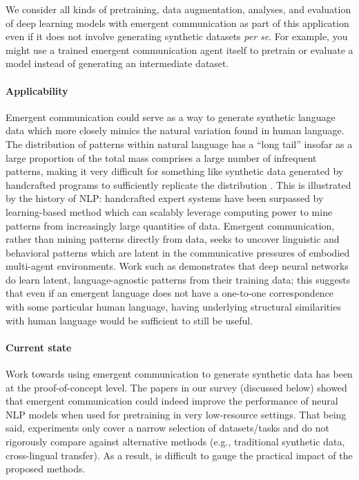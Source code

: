 We consider all kinds of pretraining, data augmentation, analyses, and evaluation of deep learning models with emergent communication as part of this application even if it does not involve generating synthetic datasets \emph{per se}.
For example, you might use a trained emergent communication agent itself to pretrain or evaluate a model instead of generating an intermediate dataset.


\paragraph{Applicability}

Emergent communication could serve as a way to generate synthetic language data which more closely mimics the natural variation found in human language.
The distribution of patterns within natural language has a ``long tail'' insofar as a large proportion of the total mass comprises a large number of infrequent patterns, making it very difficult for something like synthetic data generated by handcrafted programs to sufficiently replicate the distribution \citep{naikthesis}.
This is illustrated by the history of NLP\@: handcrafted expert systems have been surpassed by learning-based method which can scalably leverage computing power to mine patterns from increasingly large quantities of data.
Emergent communication, rather than mining patterns directly from data, seeks to uncover linguistic and behavioral patterns which are latent in the communicative pressures of embodied multi-agent environments.
Work such as \citet{artetxe-etal-2020-cross} demonstrates that deep neural networks do learn latent, language-agnostic patterns from their training data;
  this suggests that even if an emergent language does not have a one-to-one correspondence with some particular human language, having underlying structural similarities with human language would be sufficient to still be useful.


\paragraph{Current state}
Work towards using emergent communication to generate synthetic data has been at the proof-of-concept level.
The papers in our survey (discussed below) showed that emergent communication could indeed improve the performance of neural NLP models when used for pretraining in very low-resource settings.
That being said,
  experiments only cover a narrow selection of datasets/tasks and do not rigorously compare against alternative methods (e.g., traditional synthetic data, cross-lingual transfer).
As a result, is difficult to gauge the practical impact of the proposed methods.

